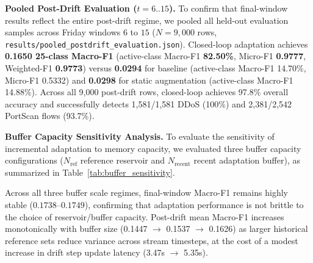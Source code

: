 \documentclass[conference]{IEEEtran}
\begin{document}
\textbf{Pooled Post-Drift Evaluation ($t=6..15$).}
To confirm that final-window results reflect the entire post-drift regime, we pooled all held-out evaluation samples across Friday windows $6$ to $15$ ($N=9,000$ rows, \texttt{results/pooled\_postdrift\_evaluation.json}). Closed-loop adaptation achieves \textbf{0.1650 25-class Macro-F1} (active-class Macro-F1 \textbf{82.50\%}, Micro-F1 \textbf{0.9777}, Weighted-F1 \textbf{0.9773}) versus \textbf{0.0294} for baseline (active-class Macro-F1 14.70\%, Micro-F1 0.5332) and \textbf{0.0298} for static augmentation (active-class Macro-F1 14.88\%). Across all 9,000 post-drift rows, closed-loop achieves 97.8\% overall accuracy and successfully detects 1,581/1,581 DDoS (100\%) and 2,381/2,542 PortScan flows (93.7\%).

\textbf{Buffer Capacity Sensitivity Analysis.}
To evaluate the sensitivity of incremental adaptation to memory capacity, we evaluated three buffer capacity configurations ($N_{\text{ref}}$ reference reservoir and $N_{\text{recent}}$ recent adaptation buffer), as summarized in Table~\ref{tab:buffer_sensitivity}.

\begin{table}[!t]
\centering
\caption{Buffer Capacity Sensitivity Analysis (\textsc{BoundedBufferClassifier})}
\label{tab:buffer_sensitivity}
\end{table}

Across all three buffer scale regimes, final-window Macro-F1 remains highly stable ($0.1738$--$0.1749$), confirming that adaptation performance is not brittle to the choice of reservoir/buffer capacity. Post-drift mean Macro-F1 increases monotonically with buffer size (0.1447 $\rightarrow$ 0.1537 $\rightarrow$ 0.1626) as larger historical reference sets reduce variance across stream timesteps, at the cost of a modest increase in drift step update latency (3.47s $\rightarrow$ 5.35s).
\end{document}
